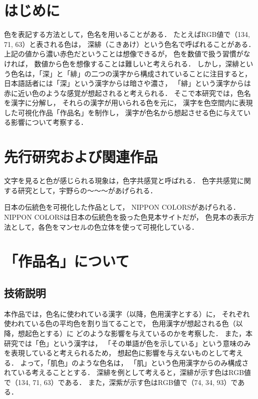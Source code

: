 \documentclass[a4j,twocolumn]{ujarticle} %
\newcommand{\visualizationtitle}{「作品名」}
\newcommand{\colorkanji}{色用漢字}
\newcommand{\recallcolor}{想起色}
\begin{document}
\maketitle
\thispagestyle{myheadings}

\section{はじめに}

色を表記する方法として，色名を用いることがある．
たとえばRGB値で（134, 71, 63）と表される色は，
深緋（こきあけ）という色名で呼ばれることがある．
上記の値から濃い赤色だということは想像できるが，
色を数値で扱う習慣がなければ，
数値から色を想像することは難しいと考えられる．
しかし，深緋という色名は，「深」と「緋」の二つの漢字から構成されていることに注目すると，
日本語話者には「深」という漢字からは暗さや濃さ，
「緋」という漢字からは赤に近い色のような感覚が想起されると考えられる．
そこで本研究では，色名を漢字に分解し，
それらの漢字が用いられる色を元に，
漢字を色空間内に表現した可視化作品\visualizationtitle{}を制作し，
漢字が色名から想起させる色に与えている影響について考察する．

\section{先行研究および関連作品}

文字を見ると色が感じられる現象は，色字共感覚と呼ばれる．
色字共感覚に関する研究として，宇野ら\cite{Uno2018}の〜〜〜があげられる．

日本の伝統色を可視化した作品として，
NIPPON COLORS\cite{NipponColors}があげられる．
NIPPON COLORSは日本の伝統色を扱った色見本サイトだが，
色見本の表示方法として，各色をマンセルの色立体を使って可視化している．

\section{\visualizationtitle{}について}

\subsection{技術説明}

本作品では，色名に使われている漢字（以降，\colorkanji{}とする）に，
それぞれ使われている色の平均色を割り当てることで，
\colorkanji{}が想起される色（以降，\recallcolor{}とする）に
どのような影響を与えているのかを考察した．
また，本研究では「色」という漢字は，
「その単語が色を示している」という意味のみを表現していると考えられるため，
\recallcolor{}に影響を与えないものとして考える．
よって，「肌色」のような色名は，
「肌」という\colorkanji{}からのみ構成されている考えることとする．
深緋を例として考えると，深緋が示す色はRGB値で（134, 71, 63）である．
また，深紫が示す色はRGB値で（74, 34, 93）である．
\end{document}
